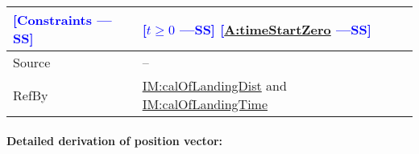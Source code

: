\documentclass[12pt]{article}
\newcommand{\authornote}[3]{\textcolor{#1}{[#3 ---#2]}}
\newcommand{\authornote}[3]{}
\newcommand{\wss}[1]{\authornote{blue}{SS}{#1}}
\begin{document}
\begin{minipage}{\textwidth}
\begin{tabular}{>{\raggedright}p{}>{\raggedright\arraybackslash}p{}}
              \\ \midrule
\wss{Constraints} & \wss{$t \geq 0$} \wss{\hyperref[timeStartZero]{A:timeStartZero}}

\\ \midrule
Source & --
         
\\ \midrule
RefBy & \hyperref[IM:calOfLandingDist]{IM:calOfLandingDist} and \hyperref[IM:calOfLandingTime]{IM:calOfLandingTime}
        
\\ \bottomrule
\end{tabular}
\end{minipage}

\paragraph{Detailed derivation of position vector:}
\label{GD:posVecDeriv}
\end{document}

